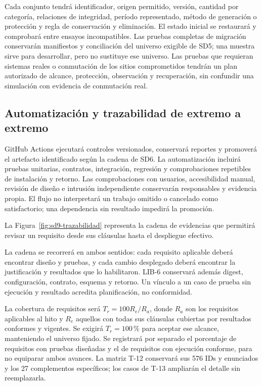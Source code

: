 Cada conjunto tendrá identificador, origen permitido, versión, cantidad por categoría, relaciones de integridad, período representado, método de generación o protección y regla de conservación y eliminación. El estado inicial se restaurará y comprobará entre ensayos incompatibles. Las pruebas completas de migración conservarán manifiestos y conciliación del universo exigible de SD5; una muestra sirve para desarrollar, pero no sustituye ese universo. Las pruebas que requieran sistemas reales o conmutación de los sitios comprometidos tendrán un plan autorizado de alcance, protección, observación y recuperación, sin confundir una simulación con evidencia de conmutación real. \parencites[sec.~5.3, Ensayos y conciliación]{sd9-sd5}[20.1, pp.~34--35]{sd9-bt}

\subsection{Automatización y trazabilidad de extremo a extremo}
GitHub Actions ejecutará controles versionados, conservará reportes y promoverá el artefacto identificado según la cadena de SD6. La automatización incluirá pruebas unitarias, contratos, integración, regresión y comprobaciones repetibles de instalación y retorno. Las comprobaciones con usuarios, accesibilidad manual, revisión de diseño e intrusión independiente conservarán responsables y evidencia propia. El flujo no interpretará un trabajo omitido o cancelado como satisfactorio; una dependencia sin resultado impedirá la promoción.

La Figura~\ref{fig:sd9-trazabilidad} representa la cadena de evidencias que permitirá revisar un requisito desde sus cláusulas hasta el despliegue efectivo.

La cadena se recorrerá en ambos sentidos: cada requisito aplicable deberá encontrar diseño y pruebas, y cada cambio desplegado deberá encontrar la justificación y resultados que lo habilitaron. LIB-6 conservará además digest, configuración, contrato, esquema y retorno. Un vínculo a un caso de prueba sin ejecución y resultado acredita planificación, no conformidad. \parencite[sec.~6.2, Arquitectura evolutiva, codificación y deuda técnica]{sd9-sd6}

La cobertura de requisitos será $T_r=100R_e/R_a$, donde $R_a$ son los requisitos aplicables al hito y $R_e$ aquellos con todas sus cláusulas cubiertas por resultados conformes y vigentes. Se exigirá $T_r=100\,\%$ para aceptar ese alcance, manteniendo el universo fijado. Se registrará por separado el porcentaje de requisitos con pruebas diseñadas y el de requisitos con ejecución conforme, para no equiparar ambos avances. La matriz T-12 conservará sus 576 IDs y enunciados y los 27 complementos específicos; los casos de T-13 ampliarán el detalle sin reemplazarla.

